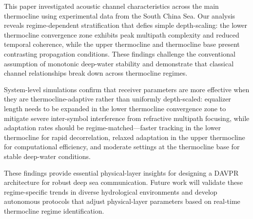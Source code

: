 \documentclass[lettersize,journal]{IEEEtran}
\begin{document}
This paper investigated acoustic channel characteristics across the main thermocline using experimental data from the South China Sea. Our analysis reveals regime-dependent stratification that defies simple depth-scaling: the lower thermocline convergence zone exhibits peak multipath complexity and reduced temporal coherence, while the upper thermocline and thermocline base present contrasting propagation conditions. These findings challenge the conventional assumption of monotonic deep-water stability and demonstrate that classical channel relationships break down across thermocline regimes.

System-level simulations confirm that receiver parameters are more effective when they are thermocline-adaptive rather than uniformly depth-scaled: equalizer length needs to be expanded in the lower thermocline convergence zone to mitigate severe inter-symbol interference from refractive multipath focusing, while adaptation rates should be regime-matched—faster tracking in the lower thermocline for rapid decorrelation, relaxed adaptation in the upper thermocline for computational efficiency, and moderate settings at the thermocline base for stable deep-water conditions.

These findings provide essential physical-layer insights for designing a DAVPR architecture for robust deep sea communication. Future work will validate these regime-specific trends in diverse hydrological environments and develop autonomous protocols that adjust physical-layer parameters based on real-time thermocline regime identification.




\end{document}
